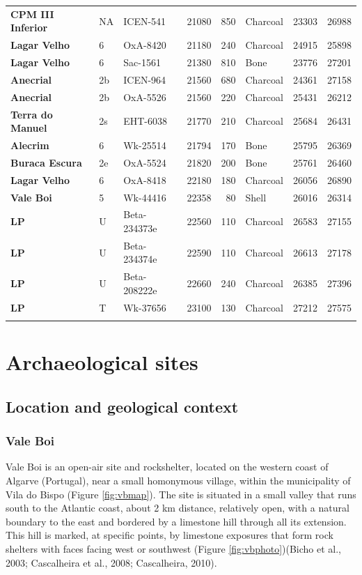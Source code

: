 \documentclass[12pt,twoside]{reedthesis}
\begin{document}
\begin{landscape}
\begin{longtable}[t]{>{\bfseries}lllrrlrr}
CPM III Inferior & NA & ICEN-541 & 21080 & 850 & Charcoal & 23303 & 26988\\
Lagar Velho & 6 & OxA-8420 & 21180 & 240 & Charcoal & 24915 & 25898\\
Lagar Velho & 6 & Sac-1561 & 21380 & 810 & Bone & 23776 & 27201\\
\addlinespace
Anecrial & 2b & ICEN-964 & 21560 & 680 & Charcoal & 24361 & 27158\\
Anecrial & 2b & OxA-5526 & 21560 & 220 & Charcoal & 25431 & 26212\\
Terra do Manuel & 2s & EHT-6038 & 21770 & 210 & Charcoal & 25684 & 26431\\
Alecrim & 6 & Wk-25514 & 21794 & 170 & Bone & 25795 & 26369\\
Buraca Escura & 2e & OxA-5524 & 21820 & 200 & Bone & 25761 & 26460\\
\addlinespace
Lagar Velho & 6 & OxA-8418 & 22180 & 180 & Charcoal & 26056 & 26890\\
Vale Boi & 5 & Wk-44416 & 22358 & 80 & Shell & 26016 & 26314\\
LP & U & Beta-234373e & 22560 & 110 & Charcoal & 26583 & 27155\\
LP & U & Beta-234374e & 22590 & 110 & Charcoal & 26613 & 27178\\
LP & U & Beta-208222e & 22660 & 240 & Charcoal & 26385 & 27396\\
\addlinespace
LP & T & Wk-37656 & 23100 & 130 & Charcoal & 27212 & 27575\\*
\end{longtable}
\endgroup{}
\end{landscape}
\hypertarget{archaeological-sites}{%
\chapter{Archaeological sites}\label{archaeological-sites}}

\hypertarget{location-and-geological-context}{%
\section{Location and geological context}\label{location-and-geological-context}}

\hypertarget{vale-boi}{%
\subsection{Vale Boi}\label{vale-boi}}

Vale Boi is an open-air site and rockshelter, located on the western coast of Algarve (Portugal), near a small homonymous village, within the municipality of Vila do Bispo (Figure \ref{fig:vbmap}). The site is situated in a small valley that runs south to the Atlantic coast, about 2 km distance, relatively open, with a natural boundary to the east and bordered by a limestone hill through all its extension. This hill is marked, at specific points, by limestone exposures that form rock shelters with faces facing west or southwest (Figure \ref{fig:vbphoto})(Bicho et al., 2003; Cascalheira et al., 2008; Cascalheira, 2010).
\end{document}
